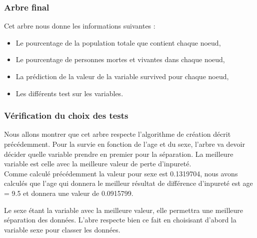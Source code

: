 \documentclass[compress]{beamer}
\begin{document}
\begin{frame}
\frametitle{Arbre final}
Cet arbre nous donne les informations suivantes : \newline
\begin{itemize}
 \item Le pourcentage de la population totale que contient chaque noeud,
 \item Le pourcentage de personnes mortes et vivantes dans chaque noeud,
 \item La prédiction de la valeur de la variable \textrm{survived} pour chaque noeud,
 \item Les différents test sur les variables.
\end{itemize}

\end{frame}
\begin{frame}
 \frametitle{Vérification du choix des tests}
Nous allons montrer que cet arbre respecte l'algorithme de création décrit précédemment. Pour la survie en fonction de l'age et du sexe, l'arbre va devoir décider quelle
variable prendre en premier pour la séparation. La meilleure variable est celle avec la meilleure valeur de perte d'inpureté. \\
Comme calculé précédemment la valeur pour sexe est 0.1319704, nous avons calculés que l'age qui donnera le meilleur résultat de différence d'inpureté est \textrm{age = 9.5} et donnera
une valeur de 0.0915799.\newline

Le sexe étant la variable avec la meilleure valeur, elle permettra une meilleure séparation des données. L'abre respecte bien ce fait en choisisant d'abord la variable sexe pour
classer les données.
\end{frame}
\end{document}
